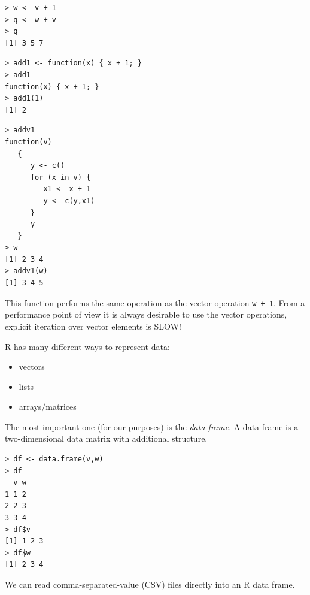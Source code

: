 \documentclass[a4paper,blends,pdf,colorBG,slideColor]{prosper}
\begin{document}
\vspace{.5in}

\begin{minipage}[t]{1.5in}
\begin{verbatim}
> w <- v + 1
> q <- w + v
> q
[1] 3 5 7
\end{verbatim}
\end{minipage}
\begin{minipage}[t]{2in}
\begin{verbatim}
> add1 <- function(x) { x + 1; }
> add1
function(x) { x + 1; }
> add1(1)
[1] 2
\end{verbatim}
\end{minipage}

\es

\begin{minipage}[t]{2in}
\begin{verbatim}
> addv1
function(v) 
   { 
      y <- c() 
      for (x in v) { 
         x1 <- x + 1 
         y <- c(y,x1)
      } 
      y
   }
> w
[1] 2 3 4
> addv1(w)
[1] 3 4 5
\end{verbatim}
\end{minipage}
\begin{minipage}[t]{2in}
This function performs the same operation as the vector operation {\tt w  + 1}.
From a performance point of view it is always desirable to use the vector operations,
explicit iteration over vector elements is SLOW!
\end{minipage}

\es

R has many different ways to represent data:
\begin{itemize}
\item vectors
\item lists
\item arrays/matrices
\end{itemize}
The most important one (for our purposes) is the {\em data frame}.  A data frame is
a two-dimensional data matrix with additional structure.
\begin{center}
\begin{minipage}[t]{2in}
\begin{verbatim}
> df <- data.frame(v,w)
> df
  v w
1 1 2
2 2 3
3 3 4
> df$v
[1] 1 2 3
> df$w
[1] 2 3 4
\end{verbatim}
\end{minipage}
\end{center}
\es

We can read comma-separated-value (CSV) files directly into an R data frame.
\end{document}
